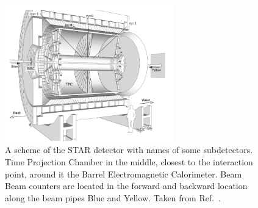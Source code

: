 \FloatBarrier
\begin{figure}[ht]
    \centering
    \includegraphics[width=0.65\textwidth]{figures/dete.jpg}
    \caption[Schematic view of the Solenoidal Tracker At Rhic]{A scheme of the STAR detector with names of some subdetectors. Time Projection Chamber in the middle, closest to the interaction point, around it the Barrel Electromagnetic Calorimeter. Beam Beam counters are located in the forward and backward location along the beam pipes Blue and Yellow. Taken from Ref.~\cite{dete}.}
    \label{df4}
\end{figure}
\FloatBarrier


